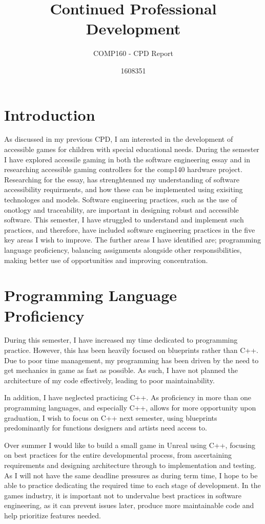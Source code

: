 \documentclass{scrartcl}
\title{Continued Professional Development}
\subtitle{COMP160 - CPD Report}
\author{1608351}
\begin{document}
\maketitle

\section{Introduction}

As discussed in my previous CPD, I am interested in the development of accessible games for children with special educational needs. During the semester I have explored accessile gaming in both the software engineering essay and in researching accessible gaming controllers for the comp140 hardware project. Researching for the essay, has strenghtenned my understanding of  software accessibility requirments, and how these can be implemented using exisiting technologes and models. Software engineering practices, such as the use of onotlogy and traceability, are important in designing robust and accessible software. This semester, I have struggled to understand and implement such practices, and therefore, have included software engineering practices in the five key areas I wish to improve. The further areas I have identified are;  programming language proficiency,  balancing assignments alongside other responsibilities, making better use of opportunities and improving concentration. 
\cite{shannon}

\section{Programming Language Proficiency}

During this semester, I have increased my time dedicated to programming practice. However, this has been heavily focused on blueprints rather than C++. Due to poor time management, my programming has been driven by the need to get mechanics in game as fast as possible. As such, I have not planned the architecture of my code effectively, leading to poor maintainability.

In addition, I have neglected practicing C++. As proficiency in more than one programming languages, and especially C++, allows for more opportunity upon graduation, I wish to focus on C++ next semester, using blueprints predominantly for functions designers and artists need access to.

Over summer I would like to build a small game in Unreal using C++, focusing on best practices for the entire developmental process, from ascertaining requirements and designing architecture through to implementation and testing. As I will not have the same deadline pressures as during term time, I hope to be able to practice dedicating the required time to each stage of development. In the games industry, it is important not to undervalue best practices in software engineering, as it can prevent issues later, produce more maintainable code and help prioritize features needed.
\end{document}
